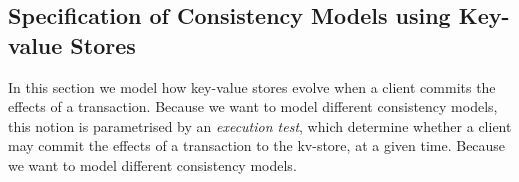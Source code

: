 \subsection{Specification of Consistency Models using Key-value Stores}
\label{sec:execution.tests}

In this section we model how key-value stores evolve when a client commits 
the effects of a transaction.
Because we want to model different consistency models, 
this notion is parametrised by an \emph{execution test}, which determine whether 
a client may commit the effects of a transaction to the kv-store, at a given time.
Because we want to model different consistency models.

